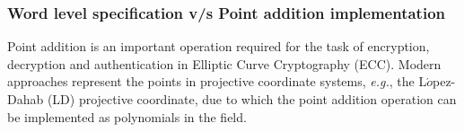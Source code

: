 
\subsubsection{Word level specification v/s Point addition implementation}
Point addition is an important operation required for the task of encryption, decryption 
and authentication in Elliptic Curve Cryptography (ECC). 
Modern approaches represent the points in projective
coordinate systems, {\it e.g.}, the L$\acute{o}$pez-Dahab (LD) projective coordinate, due to which the point addition 
operation can be implemented as polynomials in the field.

